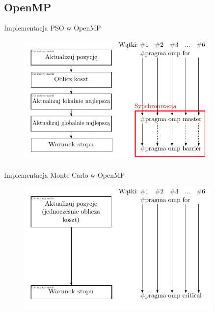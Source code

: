 \documentclass[handout]{beamer}
\begin{document}
\subsection{OpenMP}
\begin{frame}{Implementacja PSO w OpenMP}
\begin{figure}[t]
\includegraphics[width=0.9\textwidth]{grafiki/alg_OpenMP_synchronizacja.pdf}
\end{figure}
\end{frame}

\begin{frame}{Implementacja Monte Carlo w OpenMP}
\begin{figure}[t]
\includegraphics[width=0.9\textwidth]{grafiki/alg_OpenMP_MC.pdf}
\end{figure}
\end{frame}
\end{document}
